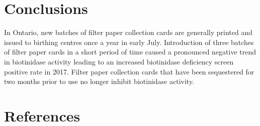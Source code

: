 \documentclass[review]{elsarticle}
\begin{document}
\section*{Conclusions}
\label{sec:org2142f3a}
In Ontario, new batches of filter paper collection cards are
generally printed and issued to birthing centres once a year in
early July. Introduction of three batches of filter paper cards in a
short period of time caused a pronounced negative trend in
biotinidase activity leading to an increased biotinidase deficiency
screen positive rate in 2017. Filter paper collection cards that
have been sequestered for two months prior to use no longer inhibit
biotinidase activity.

\section*{References}
\label{sec:orga785322}
\end{document}
